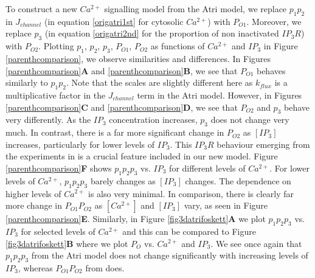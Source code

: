 To construct a new $Ca^{2+}$ signalling model from the Atri model, we replace $p_1p_2$ in $J_{channel}$ (in equation \eqref{origatri1st} for cytosolic $Ca^{2+}$) with $P_{O1}$. Moreover, we replace $p_3$ (in equation \eqref{origatri2nd} for the proportion of non inactivated $IP_3R$) with $P_{O2}$. Plotting $p_1$, $p_2$, $p_3$, $P_{O1}$, $P_{O2}$ as functions of $Ca^{2+}$ and $IP_3$ in Figure \ref{parenthcomparison}, we observe similarities and differences. In Figures \ref{parenthcomparison}\textbf{A} and \ref{parenthcomparison}\textbf{B}, we see that $P_{O1}$ behaves similarly to $p_1p_2$. Note that the scales are slightly different here as $k_{flux}$ is a multiplicative factor in the $J_{channel}$ term in the Atri model. However, in Figures \ref{parenthcomparison}\textbf{C} and \ref{parenthcomparison}\textbf{D}, we see that $P_{O2}$ and $p_3$ behave very differently. As the $IP_3$ concentration increases, $p_3$ does not change very much. In contrast, there is a far more significant change in $P_{O2}$ as $[IP_3]$ increases, particularly for lower levels of $IP_3$. This $IP_3R$ behaviour emerging from the experiments in  is a crucial feature included in our new model. Figure \ref{parenthcomparison}\textbf{F} shows $p_1p_2p_3$ vs. $IP_3$ for different levels of $Ca^{2+}$. For lower levels of $Ca^{2+}$, $p_1p_2p_3$ barely changes as $[IP_3]$ changes. The dependence on higher levels of $Ca^{2+}$ is also very minimal. In comparison, there is clearly far more change in $P_{O1}P_{O2}$ as $[Ca^{2+}]$ and $[IP_3]$ vary, as seen in Figure \ref{parenthcomparison}\textbf{E}. Similarly, in Figure \ref{fig3datrifoskett}\textbf{A} we plot $p_1p_2p_3$ vs. $IP_3$ for selected levels of $Ca^{2+}$ and this can be compared to Figure \ref{fig3datrifoskett}\textbf{B} where we plot $P_O$ vs. $Ca^{2+}$ and $IP_3$. We see once again that $p_1p_2p_3$ from the Atri model does not change significantly with increasing levels of $IP_3$, whereas $P_{O1}P_{O2}$ from  does.

